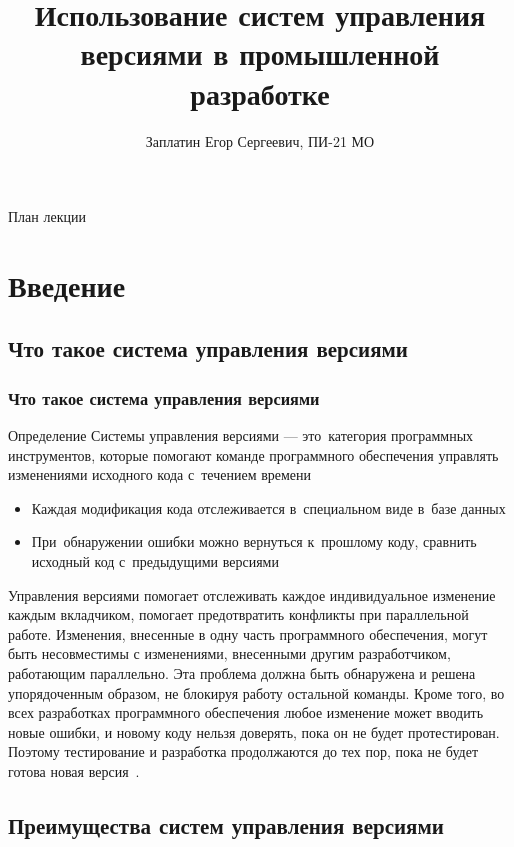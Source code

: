 \documentclass{../industrial-development}
\title{Использование систем управления версиями в промышленной разработке}
\author{Заплатин Егор Сергеевич, ПИ-21 МО}
\date{}
\begin{document}
\begin{frame}
  \titlepage
\end{frame}

\begin{frame}{План лекции}
  \tableofcontents
\end{frame}

\section{Введение}

\subsection{Что такое система управления версиями}

\begin{frame} \frametitle{Что такое система управления версиями}
  \begin{block}{Определение}
    \alert{Системы управления версиями} --- это~категория программных инструментов, которые помогают команде программного обеспечения управлять изменениями исходного кода с~течением времени
  \end{block}
  
  \begin{itemize}
  \item Каждая модификация кода отслеживается в~специальном виде в~базе данных
  \item При~обнаружении ошибки можно вернуться к~прошлому коду, сравнить исходный код с~предыдущими версиями
  \end{itemize}
\end{frame}

\lecturenotes

Управления версиями помогает отслеживать каждое индивидуальное изменение каждым вкладчиком, помогает предотвратить конфликты при параллельной работе. Изменения, внесенные в одну часть программного обеспечения, могут быть несовместимы с изменениями, внесенными другим разработчиком, работающим параллельно. Эта проблема должна быть обнаружена и решена упорядоченным образом, не блокируя работу остальной команды. Кроме того, во всех разработках программного обеспечения любое изменение может вводить новые ошибки, и новому коду нельзя доверять, пока он не будет протестирован. Поэтому тестирование и разработка продолжаются до тех пор, пока не будет готова новая версия~\cite{Atlassian}.

\subsection{Преимущества систем управления версиями}
\end{document}
